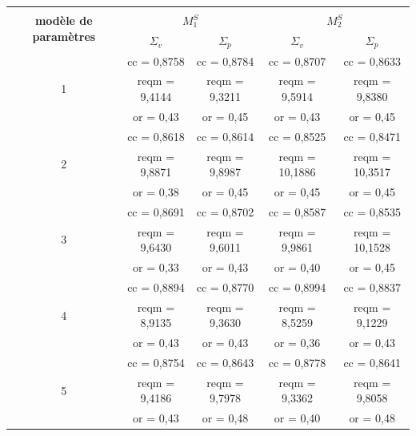 \begin{table}[htbp]
\centering
\begin{tabular}{ccccc}\toprule
\multirow{3}{2cm}{\textbf{modèle de paramètres}}		& \multicolumn{4}{c}{\strong{indicateurs de performance pour les quatre conditions}}	\\ \cmidrule{2-5}
																							& \multicolumn{2}{c}{$M^S_1$} 	& \multicolumn{2}{c}{$M^S_2$} 	\\ \cmidrule{2-5}
		& $\Sigma_v$ 			& $\Sigma_p$ 			& $\Sigma_v$ 			& $\Sigma_p$ 													\\ \toprule
		& cc = 0,8758			& cc = 0,8784			& cc = 0,8707 			& cc = 0,8633 													\\ \cmidrule{2-5}
1		& reqm = 9,4144		& reqm = 9,3211		& reqm = 9,5914 	& reqm = 9,8380												\\ \cmidrule{2-5}
		& or = 0,43				& or = 0,45				& or = 0,43				& or = 0,45	 													\\ \midrule
		& cc = 0,8618			& cc = 0,8614			& cc = 0,8525 			& cc = 0,8471 													\\ \cmidrule{2-5}
2		& reqm = 9,8871		& reqm = 9,8987		& reqm = 10,1886 	& reqm = 10,3517 											\\ \cmidrule{2-5}
		& or = 0,38				& or = 0,45				& or = 0,45				& or = 0,45														\\ \midrule
		& cc = 0,8691			& cc = 0,8702			& cc = 0,8587 			& cc = 0,8535 													\\ \cmidrule{2-5}
3		& reqm = 9,6430		& reqm = 9,6011		& reqm = 9,9861 	& reqm = 10,1528 											\\ \cmidrule{2-5}
		& \cellcolor[gray]{0.6}or = 0,33				& or = 0,43				& or = 0,40 				& or = 0,45	 					\\ \midrule
		& cc = 0,8894			& cc = 0,8770			& cc = 0,8994 			& cc = 0,8837 													\\ \cmidrule{2-5}
4		& reqm = 8,9135		& reqm = 9,3630		& reqm = 8,5259		& reqm = 9,1229 											\\ \cmidrule{2-5}
		& or = 0,43				& or = 0,43				& or = 0,36				& or = 0,43	 													\\ \midrule
		& cc = 0,8754			& cc = 0,8643			& cc = 0,8778 			& cc = 0,8641 													\\ \cmidrule{2-5}
5		& reqm = 9,4186		& reqm = 9,7978		& reqm = 9,3362 	& reqm = 9,8058 											\\ \cmidrule{2-5}
		& or = 0,43				& or = 0,48				& or = 0,40				& or = 0,48	 													\\ \midrule

\end{tabular}
\end{table}
